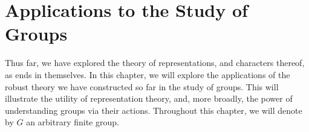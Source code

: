 \chapter{Applications to the Study of Groups}
\thispagestyle{empty}

Thus far, we have explored the theory of representations, and characters thereof, as ends in themselves. In this chapter, we will explore the applications of the robust theory we have constructed so far in the study of groups. This will illustrate the utility of representation theory, and, more broadly, the power of understanding groups via their actions. Throughout this chapter, we will denote by $G$ an arbitrary finite group.

% 




% 